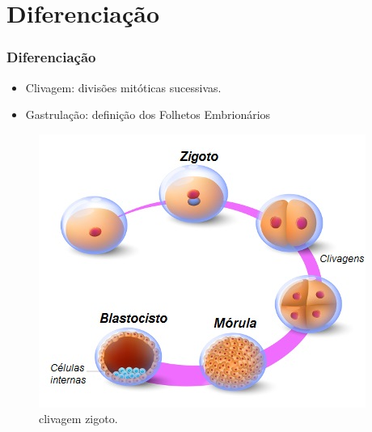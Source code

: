 \documentclass[brazil]{beamer}
\begin{document}
\section{Diferenciação}

  \begin{frame}
    \frametitle{Diferenciação}
    \raggedright  
      \begin{itemize}
      \item Clivagem: divisões mitóticas sucessivas. 
      \item Gastrulação: definição dos Folhetos Embrionários
      \end{itemize}
      \begin{figure}
	  \includegraphics[scale=0.4]{clivagem_zigoto.jpg}
	  \caption{\tiny clivagem zigoto.}
      \end{figure}
  
  \end{frame}
\end{document}
